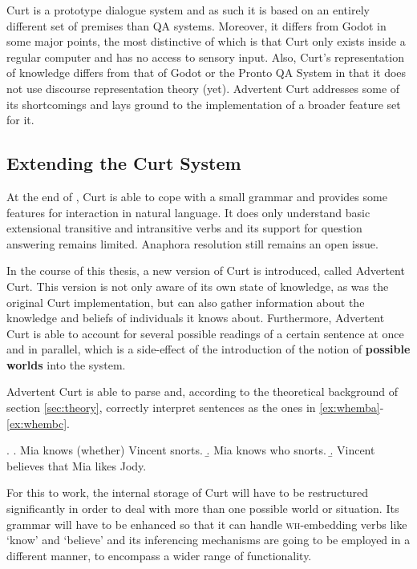 \documentclass[a4paper]{article}
\newcommand{\abbr}{\textsf} %
\newcommand{\term}[1]{\textsf{\textbf{#1}}} %
\newcommand{\pn}{\textsf} %
\newcommand{\wh}{\textsc{wh}}
\newcommand{\curt}{\pn{Curt}}
\newcommand{\acurt}{\pn{Advertent Curt}}
\theoremstyle{remark}
\theoremstyle{remark}
\theoremstyle{definition}
\theoremstyle{definition}
\begin{document}
\curt{} is a prototype dialogue system and as such it is based on an entirely different set of
premises than \abbr{QA} systems. Moreover, it differs from \pn{Godot} in some
major points, the most distinctive of which is that \curt{} only exists inside a
regular computer and has no access to sensory input. Also, \curt's
representation of knowledge differs from that of \pn{Godot} or the \pn{Pronto QA
System} in that it does not use discourse representation theory (yet). \acurt{}
addresses some of its shortcomings and lays ground to the implementation of a
broader feature set for it.

\subsection{Extending the Curt System}\label{sec:extension}

At the end of \cite{blackburnbos:cl1}, \curt{} is able to cope with a small
grammar and provides some features for interaction in natural
language. It does only understand basic extensional transitive and intransitive
verbs and its support for question answering remains limited.
Anaphora resolution still remains an open issue.

In the course of this thesis, a new version of \curt{} is introduced, called
\acurt. This version is not only aware of its own state of knowledge, as was the
original \curt{} implementation, but can also gather information about the
knowledge and beliefs of individuals it knows about. Furthermore, \acurt{} is
able to account for several possible readings of a certain sentence at once and
in parallel, which is a side-effect of the introduction of the notion of
\term{possible worlds} into the system.

\acurt{} is able to parse and, according to the theoretical background of section
\ref{sec:theory}, correctly interpret sentences as the ones in
\ref{ex:whemba}-\ref{ex:whembc}.

\ex.
\a.  Mia knows (whether) Vincent snorts.\label{ex:whemba}
\b.  Mia knows who snorts.
\b.  Vincent believes that Mia likes Jody.\label{ex:whembc}

For this to work, the internal storage of \curt{} will have to be restructured
significantly in order to deal with more than one possible world or situation.
Its grammar will have to be enhanced so that it can handle \wh-embedding verbs
like `know' and `believe' and its inferencing mechanisms are going to be
employed in a different manner, to encompass a wider range of functionality.
\end{document}

